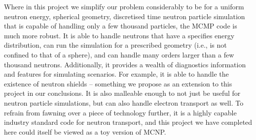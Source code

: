 Where in this project we simplify our problem considerably to be for a uniform neutron energy, spherical geometry, 
discretised time neutron particle simulation that is capable of handling only a few thousand particles, the MCMP code is 
much more robust. It is able to handle neutrons that have a specifies energy distribution, can run the simulation 
for a prescribed geometry (i.e., is not confined to that of a sphere), and can handle many orders larger than a few thousand 
neutrons. Additionally, it provides a wealth of diagnostics information and features for simulating scenarios. For example, 
it is able to handle the existence of neutron shields -- something we propose as an extension to this project in our conclusions. 
It is also malleable enough to not just be useful for neutron particle simulations, but can also handle electron transport as well. 
To refrain from fawning over a piece of technology further, it is a highly capable industry standard code for neutron transport, and this project we 
have completed here could itself be viewed as a toy version of MCNP.